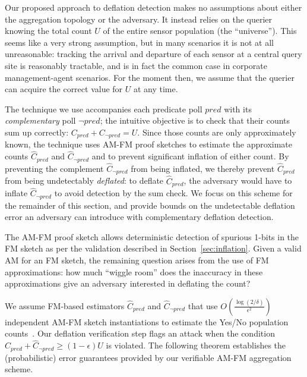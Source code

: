\documentclass[10pt,twocolumn]{article}
\newcommand{\amfm}{AM-FM\xspace}
\newcommand{\proofsketch}{proof sketch\xspace}
\newcommand{\proofsketches}{proof sketches\xspace}
\newcommand{\ProofSketches}{Proof Sketches\xspace}
\newcommand{\cpred}{\ensuremath{C_\mathit{pred}}\xspace}
\newcommand{\cnpred}{\ensuremath{C_{\neg\mathit{pred}}}\xspace}
\newcommand{\estcpred}{\ensuremath{\hat{C}_\mathit{pred}}\xspace}
\newcommand{\estcnpred}{\ensuremath{\hat{C}_{\neg\mathit{pred}}}\xspace}
\newcommand\vpar{{\vspace*{0.3em}}}
\newcommand{\stitle}[1]{\vpar\noindent{\bf #1\/}}
\begin{document}
%
\stitle{Complementary \ProofSketches.}
Our proposed approach to deflation detection makes no assumptions about
either the aggregation topology or the adversary.  It instead relies
on the querier knowing the total count $U$ of the entire sensor population (the
``universe'').  This seems like a very strong assumption, but in many
scenarios it is not at all unreasonable: tracking the arrival and
departure of each sensor at a central query site is reasonably
tractable, and is in fact the common case in corporate management-agent
scenarios.
For the moment then, we
assume that the querier can acquire the correct value for $U$ at any
time. 
%

The technique we use accompanies each predicate poll $\mathit{pred}$
with its \emph{complementary} poll $\neg\mathit{pred}$; the
intuitive objective is to check that their counts sum up correctly: $\cpred + \cnpred = U$.
Since those counts are only approximately known, the technique uses
\amfm \proofsketches to estimate  the approximate counts
$\estcpred$ and $\estcnpred$
and to prevent significant inflation of either count.  By preventing
the complement $\estcnpred$ from being inflated, we thereby prevent
$\estcpred$ from being undetectably \emph{deflated}: to deflate
$\estcpred$, the adversary would have to inflate $\estcnpred$ to avoid detection by the
sum check.  We focus on this scheme for the remainder of this
section, and provide bounds on the undetectable deflation error an
adversary can introduce with complementary deflation detection.


\label{sec:countanalysis}
\vspace{-1em}
The \amfm \proofsketch allows deterministic detection of spurious
1-bits in the FM sketch as per the validation described in
Section~\ref{sec:inflation}. 
Given a valid AM for an FM sketch, the remaining question
arises from the use of FM approximations: how much ``wiggle room''
does the inaccuracy in these approximations give an adversary
interested in deflating the count?


We assume FM-based estimators $\estcpred$
and $\estcnpred$ that use 
$O(\frac{\log(2/\delta)}{\epsilon^2})$ independent \amfm sketch instantiations to 
estimate the Yes/No population counts~\cite{Ganguly2003}.
Our deflation verification step flags an attack when the condition 
$\estcpred +\estcnpred\geq (1-\epsilon)U$ 
is violated. 
The following theorem 
establishes the (probabilistic) error guarantees 
provided by our verifiable \amfm aggregation scheme.
\end{document}

